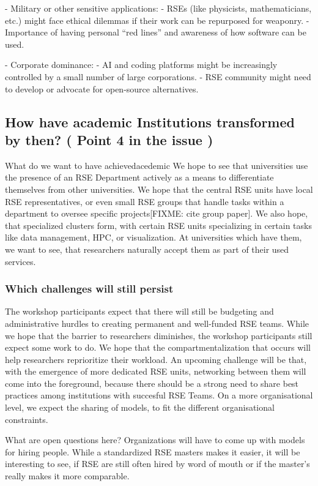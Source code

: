 \documentclass{eceasst}
\begin{document}
- Military or other sensitive applications:
  - RSEs (like physicists, mathematicians, etc.) might face ethical dilemmas if their work can be repurposed for weaponry.
  - Importance of having personal “red lines” and awareness of how software can be used.

- Corporate dominance:
  - AI and coding platforms might be increasingly controlled by a small number of large corporations.
  - RSE community might need to develop or advocate for open-source alternatives.

\subsection{How have academic Institutions transformed by then? ( Point 4 in the issue )}
\begin{whatis}{What do we want to have achieved}{acedemic}
We hope to see that universities use the presence of an RSE Department actively as a means to differentiate themselves from other universities.
We hope that the central RSE units have local RSE representatives, or even small RSE groups that handle tasks within a department to oversee specific projects[FIXME: cite group paper].
We also hope, that specialized clusters form, with certain RSE units specializing in certain tasks like data management, HPC, or visualization.
At universities which have them, we want to see, that researchers naturally accept them as part of their used services.
\end{whatis}

\subsubsection{Which challenges will still persist}
The workshop participants expect that there will still be budgeting and administrative hurdles to creating
permanent and well-funded RSE teams.
While we hope that the barrier to researchers diminishes, the workshop participants
still expect some work to do. We hope that the compartmentalization that occurs will help researchers reprioritize their workload.
An upcoming challenge will be that, with the emergence of more dedicated RSE units,
networking between them will come into the foreground, because there should be a strong need to share best practices
among institutions with succesful RSE Teams.
On a more organisational level, we expect the sharing of models, to fit the different organisational constraints.

What are open questions here?
Organizations will have to come up with models for hiring people. While
a standardized RSE masters makes it easier, it will be interesting to see, if
RSE are still often hired by word of mouth or if the master's really makes it more comparable.
\end{document}
